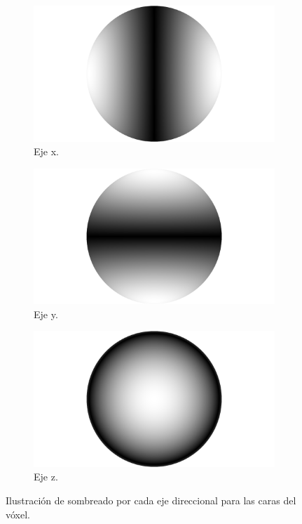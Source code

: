 \begin{figure}[H]
	\centering
	\begin{subfigure}[t]{0.33\textwidth}
		\centering
		\captionsetup{justification=centering}
		\includegraphics[width=\linewidth]{media/lambert_right.png}
		\caption*{Eje x.}
	\end{subfigure}%
	\begin{subfigure}[t]{0.33\textwidth}
		\centering
		\captionsetup{justification=centering}
		\includegraphics[width=\linewidth]{media/lambert_up.png}
		\caption*{Eje y.}
	\end{subfigure}%
	\begin{subfigure}[t]{0.33\textwidth}
		\centering
		\captionsetup{justification=centering}
		\includegraphics[width=\linewidth]{media/lambert_forward.png}
		\caption*{Eje z.}
	\end{subfigure}%
	\caption{Ilustración de sombreado por cada eje direccional para las caras del vóxel.}
	\label{fig:lambert_dir}
\end{figure}

